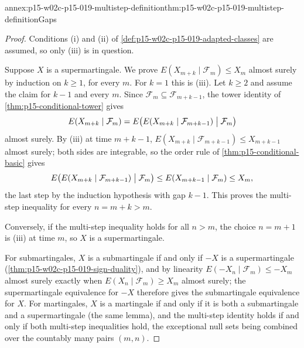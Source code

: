 \begin{annexitem}{annex:p15-w02c-p15-019-multistep-definition}{thm:p15-w02c-p15-019-multistep-definition}{Gaps}
\begin{proof}
Conditions (i) and (ii) of \cref{def:p15-w02c-p15-019-adapted-classes}
are assumed, so only (iii) is in question.

Suppose \(X\) is a supermartingale. We prove
\(E(X_{m+k}\mid\mathcal F_m)\leq X_m\) almost surely by induction on
\(k\geq1\), for every \(m\). For \(k=1\) this is (iii). Let \(k\geq2\)
and assume the claim for \(k-1\) and every \(m\). Since
\(\mathcal F_m\subseteq\mathcal F_{m+k-1}\), the tower identity of
\cref{thm:p15-conditional-tower} gives
\[
 E(X_{m+k}\mid\mathcal F_m)
   =E\bigl(E(X_{m+k}\mid\mathcal F_{m+k-1})\bigm|\mathcal F_m\bigr)
\]
almost surely. By (iii) at time \(m+k-1\),
\(E(X_{m+k}\mid\mathcal F_{m+k-1})\leq X_{m+k-1}\) almost surely; both
sides are integrable, so the order rule of
\cref{thm:p15-conditional-basic} gives
\[
 E\bigl(E(X_{m+k}\mid\mathcal F_{m+k-1})\bigm|\mathcal F_m\bigr)
   \leq E(X_{m+k-1}\mid\mathcal F_m)\leq X_m ,
\]
the last step by the induction hypothesis with gap \(k-1\). This proves
the multi-step inequality for every \(n=m+k>m\).

Conversely, if the multi-step inequality holds for all \(n>m\), the
choice \(n=m+1\) is (iii) at time \(m\), so \(X\) is a supermartingale.

For submartingales, \(X\) is a submartingale if and only if \(-X\) is a
supermartingale (\cref{thm:p15-w02c-p15-019-sign-duality}), and by
linearity \(E(-X_n\mid\mathcal F_m)\leq-X_m\) almost surely exactly when
\(E(X_n\mid\mathcal F_m)\geq X_m\) almost surely; the supermartingale
equivalence for \(-X\) therefore gives the submartingale equivalence
for \(X\). For martingales, \(X\) is a martingale if and only if it is
both a submartingale and a supermartingale (the same lemma), and the
multi-step identity holds if and only if both multi-step inequalities
hold, the exceptional null sets being combined over the countably many
pairs \((m,n)\).
\end{proof}
\end{annexitem}

